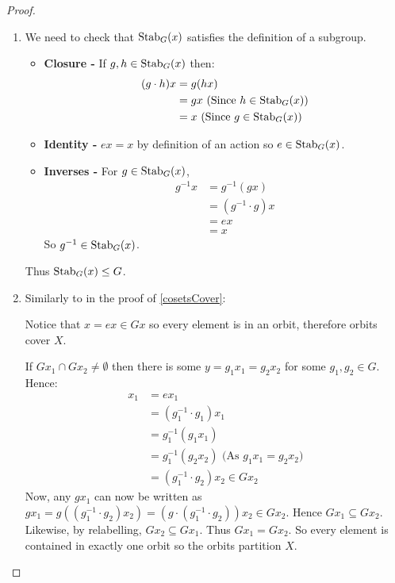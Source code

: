 \documentclass[../main.tex]{subfiles}
\begin{document}
\begin{proof}
  \begin{enumerate}
    \item We need to check that $\operatorname{Stab}_G(x)$ satisfies the definition of a subgroup.
      \begin{itemize}
        \item \textbf{Closure - }
          If $g, h \in \operatorname{Stab}_G(x)$ then:
          \begin{align*}
            (g \cdot h)x &= g(hx) \\
                    &= gx \text{ (Since $h \in \operatorname{Stab}_G(x)$)}\\
                    &= x \text{ (Since $g \in \operatorname{Stab}_G(x)$)}
          \end{align*}
        \item \textbf{Identity - } $ex = x$ by definition of an action so $e \in \operatorname{Stab}_G(x)$.
        \item \textbf{Inverses - }
          For $g \in \operatorname{Stab}_G(x)$,
          \begin{align*}
            g^{-1}x &= g^{-1}(gx) \\
                    &= (g^{-1} \cdot g)x \\
                    &= ex \\
                    &= x
          \end{align*}
          So $g^{-1} \in \operatorname{Stab}_G(x)$.
      \end{itemize}
      Thus $\operatorname{Stab}_G(x) \leq G$.
    \item Similarly to in the proof of \cref{cosetsCover}:

      Notice that $x = ex \in Gx$ so every element is in an orbit, therefore orbits cover $X$.

      If $Gx_1 \cap Gx_2 \neq \emptyset$ then there is some $y = g_1 x_1 = g_2 x_2$ for some $g_1, g_2 \in G$.
      Hence:
      \begin{align*}
        x_1 &= ex_1 \\
            &=(g^{-1}_{1} \cdot g_1) x_1 \\
            &= g^{-1}_1 (g_1 x_1) \\
            &= g^{-1}_1 (g_2 x_2) \text{ (As $g_1 x_1 = g_2 x_2$)} \\
            &= (g^{-1}_{1} \cdot g_2)x_2 \in Gx_2
      \end{align*}
      Now, any $gx_1$ can now be written as $gx_1 = g((g^{-1}_{1} \cdot g_2)x_2) = (g \cdot (g^{-1}_{1} \cdot g_2))x_2 \in Gx_2$.
      Hence $Gx_1 \subseteq Gx_2$.
      Likewise, by relabelling, $Gx_2 \subseteq Gx_1$.
      Thus $Gx_1 = Gx_2$.
      So every element is contained in exactly one orbit so the orbits partition $X$.
  \end{enumerate}
\end{proof}
\end{document}
